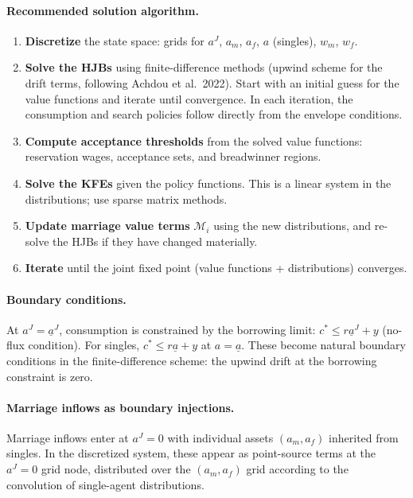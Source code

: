 \documentclass[11pt]{article}
\newcommand{\aJ}{a^{J}}
\newcommand{\aJbar}{\underline{a}^{J}}
\newcommand{\abar}{\underline{a}}
\begin{document}
\paragraph{Recommended solution algorithm.}
\begin{enumerate}
    \item \textbf{Discretize} the state space: grids for $\aJ$, $a_m$, $a_f$, $a$ (singles), $w_m$, $w_f$.
    \item \textbf{Solve the HJBs} using finite-difference methods (upwind scheme for the drift terms, following Achdou et al.\ 2022). Start with an initial guess for the value functions and iterate until convergence. In each iteration, the consumption and search policies follow directly from the envelope conditions.
    \item \textbf{Compute acceptance thresholds} from the solved value functions: reservation wages, acceptance sets, and breadwinner regions.
    \item \textbf{Solve the KFEs} given the policy functions. This is a linear system in the distributions; use sparse matrix methods.
    \item \textbf{Update marriage value terms} $\mathcal{M}_i$ using the new distributions, and re-solve the HJBs if they have changed materially.
    \item \textbf{Iterate} until the joint fixed point (value functions + distributions) converges.
\end{enumerate}

\paragraph{Boundary conditions.}
At $\aJ = \aJbar$, consumption is constrained by the borrowing limit: $c^* \leq r\aJbar + y$ (no-flux condition). For singles, $c^* \leq r\abar + y$ at $a = \abar$. These become natural boundary conditions in the finite-difference scheme: the upwind drift at the borrowing constraint is zero.

\paragraph{Marriage inflows as boundary injections.} Marriage inflows enter at $\aJ = 0$ with individual assets $(a_m, a_f)$ inherited from singles. In the discretized system, these appear as point-source terms at the $\aJ = 0$ grid node, distributed over the $(a_m, a_f)$ grid according to the convolution of single-agent distributions.

\newpage


\end{document}
